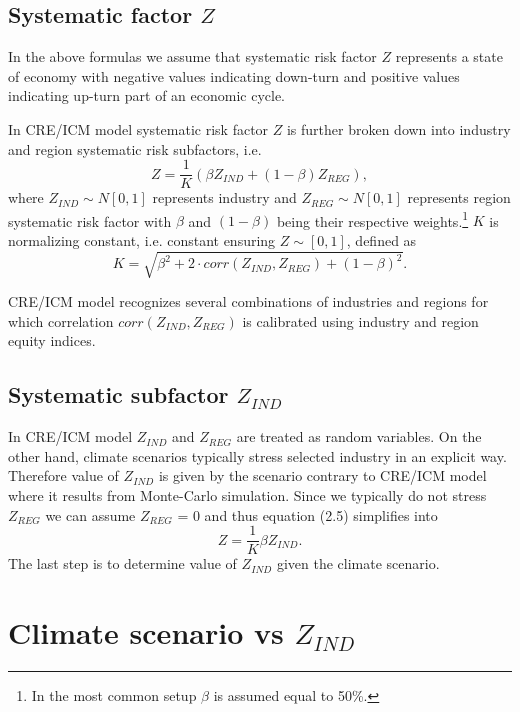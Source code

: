 \documentclass[a4paper]{book}
\begin{document}
\subsection{Systematic factor $Z$}

In the above formulas we assume that systematic risk factor $Z$ represents a state of economy with negative values indicating down-turn and positive values indicating up-turn part of an economic cycle.

In CRE/ICM model systematic risk factor $Z$ is further broken down into industry and region systematic risk subfactors, i.e.
\begin{equation}
Z = \frac{1}{K}(\beta Z_{IND} + (1 - \beta) Z_{REG}),
\end{equation}
where $Z_{IND} \sim N[0, 1]$ represents industry and $Z_{REG} \sim N[0, 1]$ represents region systematic risk factor with $\beta$ and $(1 - \beta)$ being their respective weights.\footnote{In the most common setup $\beta$ is assumed equal to 50\%.} $K$ is normalizing constant, i.e. constant ensuring $Z \sim [0, 1]$, defined as
\begin{equation}
K = \sqrt{\beta^2 + 2 \cdot corr(Z_{IND}, Z_{REG}) + (1 - \beta)^2}.
\end{equation}

CRE/ICM model recognizes several combinations of industries and regions for which correlation $corr(Z_{IND}, Z_{REG})$ is calibrated using industry and region equity indices.

\subsection{Systematic subfactor $Z_{IND}$}

In CRE/ICM model $Z_{IND}$ and $Z_{REG}$ are treated as random variables. On the other hand, climate scenarios typically stress selected industry in an explicit way. Therefore value of $Z_{IND}$ is given by the scenario contrary to CRE/ICM model where it results from Monte-Carlo simulation. Since we typically do not stress $Z_{REG}$ we can assume $Z_{REG}$ = 0 and thus equation (2.5) simplifies into
\begin{equation}
Z = \frac{1}{K}\beta Z_{IND}.
\end{equation}
The last step is to determine value of $Z_{IND}$ given the climate scenario.

\section{Climate scenario vs $Z_{IND}$}
\end{document}
